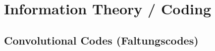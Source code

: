 \documentclass[../Main.tex]{subfiles}
\begin{document}
\chapter{Information Theory / Coding}

\intro{

}

\section{Convolutional Codes (Faltungscodes)}
\end{document}
